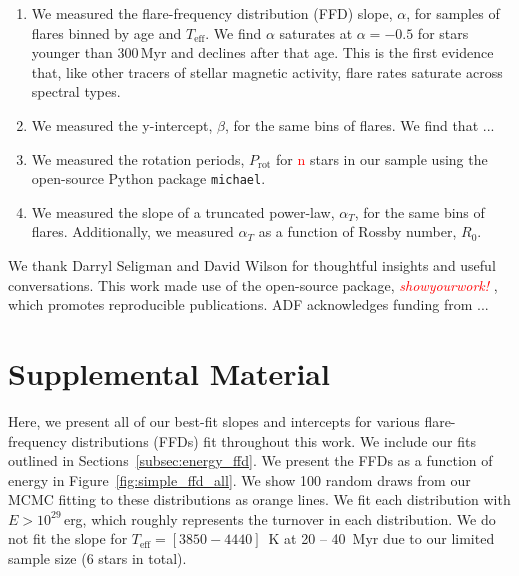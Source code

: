 \documentclass[twocolumn]{aastex631}
\begin{document}
\begin{enumerate}
  \item We measured the flare-frequency distribution (FFD) slope, $\alpha$, for samples
  of flares binned by age and $T_\textrm{eff}$. We find $\alpha$ saturates at
  $\alpha = -0.5$ for stars younger than 300\,Myr and declines after that age.
  This is the first evidence that, like other tracers of stellar magnetic activity,
  flare rates saturate across spectral types.
  \item We measured the y-intercept, $\beta$, for the same bins of flares. We find
  that ...
  \item We measured the rotation periods, $P_\textrm{rot}$ for \textcolor{red}{n}
  stars in our sample using the open-source Python package \texttt{michael}.
  \item We measured the slope of a truncated power-law, $\alpha_T$, for the same
  bins of flares. Additionally, we measured $\alpha_T$ as a function of Rossby
  number, $R_0$.
\end{enumerate}

\vspace{3mm}

We thank Darryl Seligman and David Wilson for thoughtful insights and useful
conversations. This work made use of the open-source package,
\textcolor{red}{\textit{showyourwork!}} \citep{luger2021}, which promotes
reproducible publications. ADF acknowledges funding from ...

\appendix
\restartappendixnumbering

\section{Supplemental Material}\label{appendix:supp_ffds}

Here, we present all of our best-fit slopes and intercepts for various flare-frequency distributions (FFDs) fit throughout this work. We include our fits outlined in Sections~\ref{subsec:energy_ffd}. We present the FFDs as a function of energy in Figure~\ref{fig:simple_ffd_all}. We show 100 random draws from our MCMC fitting to these distributions as orange lines. We fit each distribution with $E > 10^{29}$\,erg, which roughly represents the turnover in each distribution. We do not fit the slope for $T_\textrm{eff} = [3850 - 4440]$~K at 20 -- 40~Myr due to our limited sample size (6 stars in total).
\end{document}
